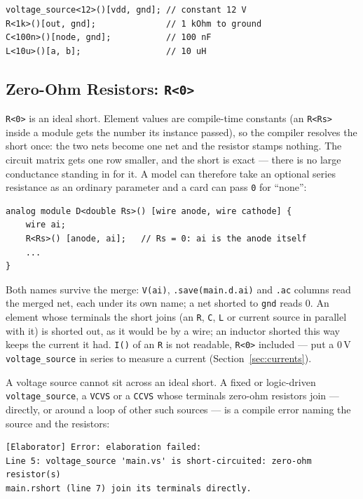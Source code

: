 \documentclass[11pt, a4paper]{article}
\newcommand{\code}[1]{\texttt{\small #1}}
\begin{document}
\begin{lstlisting}
voltage_source<12>()[vdd, gnd]; // constant 12 V
R<1k>()[out, gnd];              // 1 kOhm to ground
C<100n>()[node, gnd];           // 100 nF
L<10u>()[a, b];                 // 10 uH
\end{lstlisting}

\subsection{Zero-Ohm Resistors: \code{R<0>}}
\label{sec:rzero}

\code{R<0>} is an ideal short. Element values are compile-time constants (an
\code{R<Rs>} inside a module gets the number its instance passed), so the
compiler resolves the short once: the two nets become one net and the
resistor stamps nothing. The circuit matrix gets one row smaller, and the
short is exact --- there is no large conductance standing in for it. A model
can therefore take an optional series resistance as an ordinary parameter and
a card can pass \code{0} for ``none'':

\begin{lstlisting}
analog module D<double Rs>() [wire anode, wire cathode] {
    wire ai;
    R<Rs>() [anode, ai];   // Rs = 0: ai is the anode itself
    ...
}
\end{lstlisting}

\noindent Both names survive the merge: \code{V(ai)}, \code{.save(main.d.ai)}
and \code{.ac} columns read the merged net, each under its own name; a net
shorted to \code{gnd} reads 0. An element whose terminals the short joins (an
\code{R}, \code{C}, \code{L} or current source in parallel with it) is shorted
out, as it would be by a wire; an inductor shorted this way keeps the current
it had. \code{I()} of an \code{R} is not readable, \code{R<0>} included ---
put a 0\,V \code{voltage\_source} in series to measure a current
(Section~\ref{sec:currents}).

A voltage source cannot sit across an ideal short. A fixed or logic-driven
\code{voltage\_source}, a \code{VCVS} or a \code{CCVS} whose terminals zero-ohm
resistors join --- directly, or around a loop of other such sources --- is a
compile error naming the source and the resistors:

\begin{lstlisting}
[Elaborator] Error: elaboration failed:
Line 5: voltage_source 'main.vs' is short-circuited: zero-ohm resistor(s)
main.rshort (line 7) join its terminals directly.
\end{lstlisting}
\end{document}
